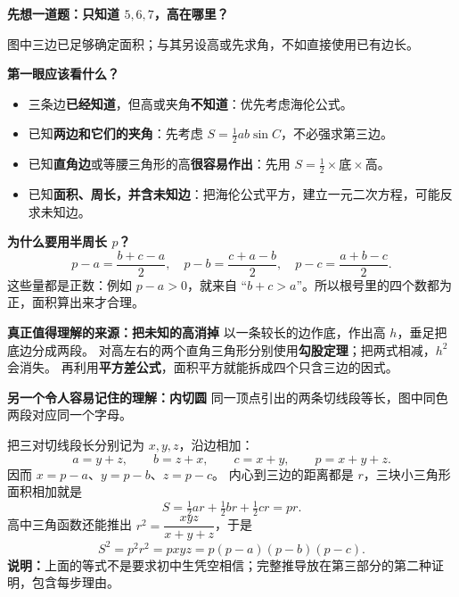 \begin{explanationbox}
	\textbf{\textcolor{CExplanation}{先想一道题：只知道 $5,6,7$，高在哪里？}}

	图中三边已足够确定面积；与其另设高或先求角，不如直接使用已有边长。

	\medskip
\par\noindent\begin{minipage}{\linewidth}
	\textbf{\textcolor{CExplanation}{第一眼应该看什么？}}
	\begin{itemize}[leftmargin=*,itemsep=0.35em]
		\item 三条边\textbf{已经知道}，但高或夹角\textbf{不知道}：优先考虑海伦公式。
		\item 已知\textbf{两边和它们的夹角}：先考虑 $S=\tfrac12 ab\sin C$，不必强求第三边。
		\item 已知\textbf{直角边}或等腰三角形的高\textbf{很容易作出}：先用 $S=\tfrac12\times\text{底}\times\text{高}$。
		\item 已知\textbf{面积、周长，并含未知边}：把海伦公式平方，建立一元二次方程，可能反求未知边。
	\end{itemize}
\end{minipage}\par

	\textbf{\textcolor{CExplanation}{为什么要用半周长 $p$？}}
	\[
		p-a=\frac{b+c-a}{2},\quad p-b=\frac{c+a-b}{2},\quad p-c=\frac{a+b-c}{2}.
	\]
	这些量都是正数：例如 $p-a>0$，就来自 ``$b+c>a$''。所以根号里的四个数都为正，面积算出来才合理。

	\textbf{\textcolor{CExplanation}{真正值得理解的来源：把未知的高消掉}}
	以一条较长的边作底，作出高 $h$，垂足把底边分成两段。
	对高左右的两个直角三角形分别使用\textbf{勾股定理}；把两式相减，$h^2$ 会消失。
	再利用\textbf{平方差公式}，面积平方就能拆成四个只含三边的因式。

	\begin{center}
		
	\end{center}

\par\noindent\begin{minipage}{\linewidth}
	\textbf{\textcolor{CExplanation}{另一个令人容易记住的理解：内切圆}}
	同一顶点引出的两条切线段等长，图中同色两段对应同一个字母。

\end{minipage}\par
	把三对切线段长分别记为 $x,y,z$，沿边相加：
	\[
		a=y+z,\qquad b=z+x,\qquad c=x+y,\qquad p=x+y+z.
	\]
	因而 $x=p-a$、$y=p-b$、$z=p-c$。
	内心到三边的距离都是 $r$，三块小三角形面积相加就是
	\[
		S=\tfrac12 ar+\tfrac12 br+\tfrac12 cr=pr.
	\]
	高中三角函数还能推出 $r^2=\dfrac{xyz}{x+y+z}$，于是
	\[
		S^2=p^2r^2=pxyz=p(p-a)(p-b)(p-c).
	\]
	\textbf{说明：}上面的等式不是要求初中生凭空相信；完整推导放在第三部分的第二种证明，包含每步理由。


\end{explanationbox}
